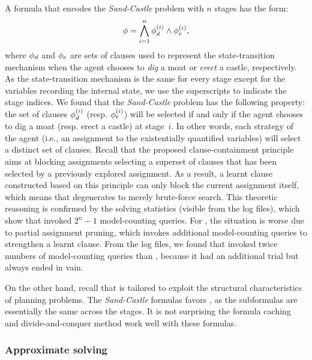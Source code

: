 A formula that encodes the \textit{Sand-Castle} problem with $n$ stages has the form:
\begin{align}
    \phi=\bigwedge_{i=1}^n \phi_d^{(i)}\land\phi_e^{(i)},
\end{align}
where $\phi_d$ and $\phi_e$ are sets of clauses used to represent the state-transition mechanism
when the agent chooses to \textit{dig} a moat or \textit{erect} a castle, respectively.
As the state-transition mechanism is the same for every stage except for the variables recording the internal state,
we use the superscripts to indicate the stage indices.
We found that the \textit{Sand-Castle} problem has the following property:
the set of clauses $\phi_d^{(i)}$ (resp. $\phi_e^{(i)}$) will be selected
if and only if the agent chooses to dig a moat (resp. erect a castle) at stage~$i$.
In other words, each strategy of the agent (i.e., an assignment to the existentially quantified variables)
will select a distinct set of clauses.
Recall that the proposed clause-containment principle aims at blocking assignments
selecting a superset of clauses that has been selected by a previously explored assignment.
As a result, a learnt clause constructed based on this principle can only block the current assignment itself,
which means that \erssatb degenerates to merely brute-force search.
This theoretic reasoning is confirmed by the solving statistics (visible from the log files),
which show that \erssatb invoked $2^n-1$ model-counting queries.
For \erssat, the situation is worse due to partial assignment pruning,
which invokes additional model-counting queries to strengthen a learnt clause.
From the log files, we found that \erssat invoked twice numbers of model-counting queries than \erssatb,
because it had an additional trial but always ended in vain.

On the other hand, recall that \dcssat is tailored to exploit the structural characteristics of planning problems.
The \textit{Sand-Castle} formulas favors \dcssat, as the subformulas are essentially the same across the stages.
It is not surprising the formula caching and divide-and-conquer method work well with these formulas.

\subsubsection{Approximate solving}

